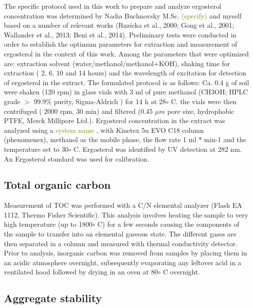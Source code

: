 \documentclass[12pt]{report}
\newcommand{\myGreen}[1]{\textcolor{olive}{#1}} %
\begin{document}
    	The specific protocol used in this work to prepare and analyze ergosterol concentration was determined by Nadia Buchnovsky M.Sc. \myGreen{(specify)} and myself based on a number of relevant works (Ruzicka et al., 2000; Gong et al., 2001; Wallander et al., 2013; Beni et al., 2014). Preliminary tests were conducted in order to establish the optimum parameters for extraction and measurement of ergosterol in the context of this work. Among the parameters that were optimized are: extraction solvent (water/methanol/methanol+KOH), shaking time for extraction ( 2, 6, 10 and 14 hours) and the wavelength of excitation for detection of ergosterol in the extract. The formulated protocol is as follows: Ca. 0.4 g of soil were shaken (120 rpm) in glass vials with 3 ml of pure methanol (CH3OH; HPLC grade $ > $ 99.9\% purity, Sigma-Aldrich ) for 14 h at 28$ \circ $ C. the vials were then centrifuged ( 2000 rpm, 30 min) and filtered (0.45 $ \mu m $ pore size, hydrophobic PTFE, Merck Millipore Ltd.). Ergosterol concentration in the extract was analyzed using a \myGreen{system name} , with Kinetex 5u EVO C18 column (phenomenex), methanol as the mobile phase, the flow rate 1 ml * min-1 and the temperature set to 30$ \circ $  C. Ergosterol was identified by UV detection at 282 nm. An Ergosterol standard was used for calibration.
    	
    
    \subsection{Total organic carbon}
    	
    	Measurement of TOC was performed with a C/N elemental analyzer (Flash EA 1112, Thermo Fisher Scientific). This analysis involves heating the sample to very high temperature (up to 1800$\circ$ C) for a few seconds causing the components of the sample to transfer into an elemental gaseous state. The different gases are then separated in a column and measured with thermal conductivity detector. Prior to analysis, inorganic carbon was removed from samples by placing them in an acidic atmosphere overnight, subsequently evaporating any leftover acid in a ventilated hood followed by drying in an oven at 80$\circ$ C overnight. 
    		
    
    \subsection{Aggregate stability}
    	
\end{document}
